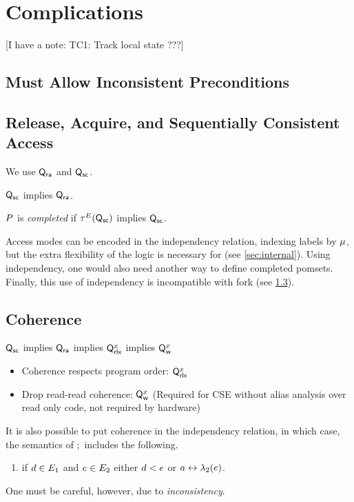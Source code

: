 \section{Complications}

[I have a note: TC1: Track local state ???]

\subsection{Must Allow Inconsistent Preconditions}

\subsection{Release, Acquire, and Sequentially Consistent Access}

We use $\Q{\mRA}$ and $\Q{\mSC}$.

$\Q{\mSC}$ implies $\Q{\mRA}$.

\begin{definition}
  $\aPS$ is \emph{completed} if $\aTr[\aEvs](\Q{\mSC})$ implies $\Q{\mSC}$.
\end{definition}

Access modes can be encoded in the independency relation, indexing labels by
$\amode$, but the extra flexibility of the logic is necessary for \armeight{}
(see \textsection\ref{sec:internal}).  Using independency, one would also
need another way to define completed pomsets.  Finally, this use of
independency is incompatible with fork (see \textsection\ref{sec:co}).

\subsection{Coherence}
\label{sec:co}

$\Q{\mSC}$ implies $\Q{\mRA}$ implies $\Qx{\aLoc}$ implies $\Qw{\aLoc}$

\begin{itemize}
\item Coherence respects program order: $\Qx{\aLoc}$
\item Drop read-read coherence: $\Qw{\aLoc}$ (Required for CSE without
  alias analysis over read only code, not required by hardware)
\end{itemize}

It is also possible to put coherence in the independency relation, in which
case, the semantics of $;$ includes the following.
\begin{enumerate}
  \setcounter{enumi}{\value{pomsetXSemiCount}}
\item
  \label{seq-reorder} if $\bEv\in\aEvs_1$ and $\aEv\in\aEvs_2$ either $\bEv<\SB0\aEv$ or $a\reorder\labeling_2(\aEv)$.
\end{enumerate}
One must be careful, however, due to \emph{inconsistency}.

